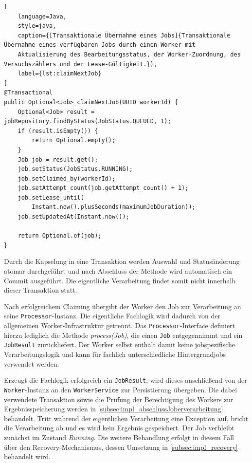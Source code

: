 \begin{lstlisting}[
    language=Java,
    style=java,
    caption={[Transaktionale Übernahme eines Jobs]{Transaktionale Übernahme eines verfügbaren Jobs durch einen Worker mit
    Aktualisierung des Bearbeitungsstatus, der Worker-Zuordnung, des Versuchszählers und der Lease-Gültigkeit.}},
    label={lst:claimNextJob}
]
@Transactional
public Optional<Job> claimNextJob(UUID workerId) {
    Optional<Job> result = jobRepository.findByStatus(JobStatus.QUEUED, 1);
    if (result.isEmpty()) {
        return Optional.empty();
    }
    Job job = result.get();
    job.setStatus(JobStatus.RUNNING);
    job.setClaimed_by(workerId);
    job.setAttempt_count(job.getAttempt_count() + 1);
    job.setLease_until(
        Instant.now().plusSeconds(maximumJobDuration));
    job.setUpdatedAt(Instant.now());

    return Optional.of(job);
}
\end{lstlisting}

Durch die Kapselung in eine Transaktion werden Auswahl und Statusänderung atomar durchgeführt und nach Abschluss der Methode
wird automatisch ein Commit ausgeführt.
Die eigentliche Verarbeitung findet somit nicht innerhalb dieser Transaktion statt.

Nach erfolgreichem Claiming übergibt der Worker den Job zur Verarbeitung an seine \texttt{Processor}-Instanz.
Die eigentliche Fachlogik wird dadurch von der allgemeinen Worker-Infrastruktur getrennt.
Das \texttt{Processor}-Interface definiert hierzu lediglich die Methode \textit{process(Job)}, die einen \texttt{Job}
entgegennimmt und ein \texttt{JobResult} zurückliefert.
Der Worker selbst enthält damit keine jobspezifische Verarbeitungslogik und kann für fachlich unterschiedliche Hintergrundjobs
verwendet werden.

Erzeugt die Fachlogik erfolgreich ein \texttt{JobResult}, wird dieses anschließend von der \texttt{Worker}-Instanz
an den \texttt{WorkerService} zur Persistierung übergeben.
Die dabei verwendete Transaktion sowie die Prüfung der Berechtigung des Workers zur Ergebnisspeicherung werden
in \cref{subsec:impl_abschlussJoberverarbeitung} behandelt.
Tritt während der eigentlichen Verarbeitung eine Exception auf, bricht die Verarbeitung ab und es wird kein Ergebnis gespeichert.
Der Job verbleibt zunächst im Zustand \textit{Running}.
Die weitere Behandlung erfolgt in diesem Fall über den Recovery-Mechanismus, dessen Umsetzung in \cref{subsec:impl_recovery}
behandelt wird.

